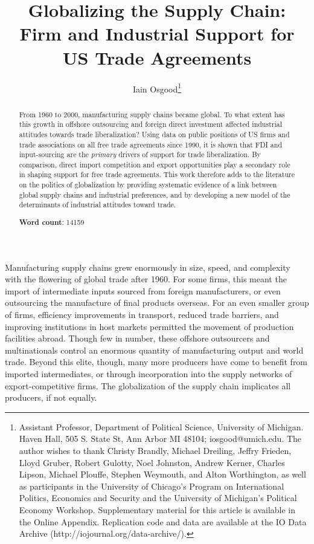 \documentclass[hidelinks,12pt,letter]{article}
\date{}
\title{\TitleFont Globalizing the Supply Chain: Firm and Industrial Support for US Trade Agreements}
\author{Iain Osgood\thanks{Assistant Professor, Department of Political Science, University of Michigan. Haven Hall, 505 S. State St, Ann Arbor MI 48104; iosgood@umich.edu. The author wishes to thank Christy Brandly, Michael Dreiling, Jeffry Frieden, Lloyd Gruber, Robert Gulotty, Noel Johnston, Andrew Kerner, Charles Lipson, Michael Plouffe, Stephen Weymouth, and Alton Worthington, as well as participants in the University of Chicago's Program on International Politics, Economics and Security and the University of Michigan's Political Economy Workshop. Supplementary material for this article is available in the Online Appendix. Replication code and data are available at the IO Data Archive (http://iojournal.org/data-archive/).}}
\begin{document}
\maketitle

\small

\begin{abstract}
\noindent 
From 1960 to 2000, manufacturing supply chains became global. To what extent has this growth in offshore outsourcing and foreign direct investment affected industrial attitudes towards trade liberalization? Using data on public positions of US firms and trade associations on all free trade agreements since 1990, it is shown that FDI and input-sourcing are the \textit{primary} drivers of support for trade liberalization. By comparison, direct import competition and export opportunities play a secondary role in shaping support for free trade agreements. This work therefore adds to the literature on the politics of globalization by providing systematic evidence of a link between global supply chains and industrial preferences, and by developing a new model of the determinants of industrial attitudes toward trade.
\bigskip
\begin{center}
\noindent \textbf{Word count}: 14159
\end{center}
\end{abstract}



\newpage 

\bigskip

\noindent 
Manufacturing supply chains grew enormously in size, speed, and complexity with the flowering of global trade after 1960. For some firms, this meant the import of intermediate inputs sourced from foreign manufacturers, or even outsourcing the manufacture of final products overseas. For an even smaller group of firms, efficiency improvements in transport, reduced trade barriers, and improving institutions in host markets permitted the movement of production facilities abroad. Though few in number, these offshore outsourcers and multinationals control an enormous quantity of manufacturing output and world trade. Beyond this elite, though, many more producers have come to benefit from imported intermediates, or through incorporation into the supply networks of export-competitive firms. The globalization of the supply chain implicates all producers, if not equally. 
\end{document}
